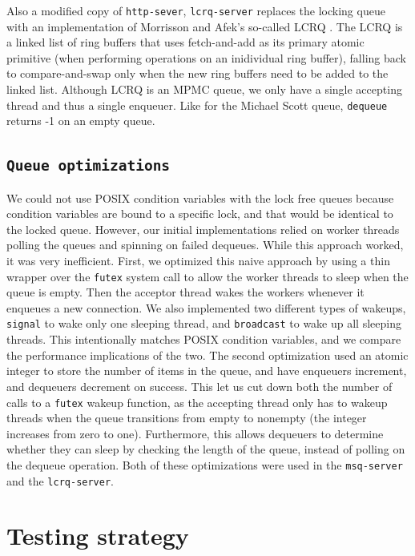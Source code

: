 \documentclass[twoside,10pt]{article}
\begin{document}
\begin{multicols}{2}
Also a modified copy of \verb+http-sever+, \verb+lcrq-server+ replaces
the locking queue with an implementation of Morrisson and Afek's
so-called LCRQ \cite{lcrq-source}. The LCRQ is a linked list of ring buffers that uses
fetch-and-add as its primary atomic primitive (when performing
operations on an inidividual ring buffer), falling back to
compare-and-swap only when the new ring buffers need to be added to
the linked list. Although LCRQ is an MPMC queue, we only have a single
accepting thread and thus a single enqueuer. Like for the Michael
Scott queue, \verb+dequeue+ returns -1 on an empty queue. 


\subsection{\texttt{Queue optimizations}}

We could not use POSIX condition variables with the lock free queues
because condition variables are bound to a specific lock, and that
would be identical to the locked queue. However, our initial
implementations relied on worker threads polling the queues and
spinning on failed dequeues. While this approach worked, it was very
inefficient. First, we optimized this naive approach by using a thin
wrapper over the \verb+futex+ system call to allow the worker threads
to sleep when the queue is empty. Then the acceptor thread wakes the
workers whenever it enqueues a new connection.  We also implemented
two different types of wakeups, \verb+signal+ to wake only one
sleeping thread, and \verb+broadcast+ to wake up all sleeping threads.
This intentionally matches POSIX condition variables, and we compare
the performance implications of the two. The second optimization used
an atomic integer to store the number of items in the queue, and have
enqueuers increment, and dequeuers decrement on success. This let us
cut down both the number of calls to a \verb+futex+ wakeup function,
as the accepting thread only has to wakeup threads when the queue
transitions from empty to nonempty (the integer increases from zero to
one). Furthermore, this allows dequeuers to determine whether they can
sleep by checking the length of the queue, instead of polling on the
dequeue operation. Both of these optimizations were used in the
\verb+msq-server+ and the \verb+lcrq-server+.

\section{Testing strategy}


\end{multicols}
\end{document}
